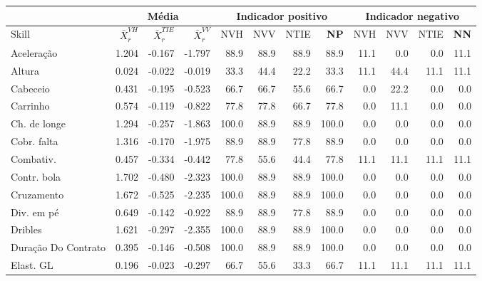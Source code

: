 \documentclass[review]{elsarticle}
\begin{document}
\begin{table}[!h]
\begin{scriptsize}
\begin{tabular}{l||rrr||rrr|r|||rrr||r}
  \hline
     \hline
\rowcolor{SeaGreen3!30!} & \multicolumn{3}{c||}{Média} &   \multicolumn{4}{c|||}{Indicador positivo} & \multicolumn{4}{c}{Indicador negativo} \\
\hline 
  \hline
\rowcolor{SeaGreen3!30!} Skill &  $\bar{X}_r^{VH}$ &  $\bar{X}_r^{TIE}$ &  $\bar{X}_r^{VV}$ & NVH & NVV & NTIE & \textbf{NP }& NVH & NVV & NTIE & \textbf{NN }\\ 
 \hline
\rowcolor{gray!30!} Aceleração & 1.204 & -0.167 & -1.797 & 88.9 & 88.9 & 88.9 & 88.9 & 11.1 & 0.0 & 0.0 & 11.1 \\ 
\rowcolor{gray!10!} Altura & 0.024 & -0.022 & -0.019 & 33.3 & 44.4 & 22.2 & 33.3 & 11.1 & 44.4 & 11.1 & 11.1 \\ 
\rowcolor{gray!30!} Cabeceio & 0.431 & -0.195 & -0.523 & 66.7 & 66.7 & 55.6 & 66.7 & 0.0 & 22.2 & 0.0 & 0.0 \\ 
\rowcolor{gray!10!} Carrinho & 0.574 & -0.119 & -0.822 & 77.8 & 77.8 & 66.7 & 77.8 & 0.0 & 11.1 & 0.0 & 0.0 \\ 
\rowcolor{gray!30!} Ch. de longe & 1.294 & -0.257 & -1.863 & 100.0 & 88.9 & 88.9 & 100.0 & 0.0 & 0.0 & 0.0 & 0.0 \\ 
\rowcolor{gray!10!} Cobr. falta & 1.316 & -0.170 & -1.975 & 88.9 & 88.9 & 77.8 & 88.9 & 0.0 & 0.0 & 0.0 & 0.0 \\ 
\rowcolor{gray!30!} Combativ. & 0.457 & -0.334 & -0.442 & 77.8 & 55.6 & 44.4 & 77.8 & 11.1 & 11.1 & 11.1 & 11.1 \\ 
\rowcolor{gray!10!} Contr. bola & 1.702 & -0.480 & -2.323 & 100.0 & 88.9 & 88.9 & 100.0 & 0.0 & 0.0 & 0.0 & 0.0 \\ 
\rowcolor{gray!30!} Cruzamento & 1.672 & -0.525 & -2.235 & 100.0 & 88.9 & 88.9 & 100.0 & 0.0 & 0.0 & 0.0 & 0.0 \\ 
\rowcolor{gray!10!} Div. em pé & 0.649 & -0.142 & -0.922 & 88.9 & 88.9 & 77.8 & 88.9 & 0.0 & 0.0 & 0.0 & 0.0 \\ 
\rowcolor{gray!30!} Dribles & 1.621 & -0.297 & -2.355 & 100.0 & 88.9 & 88.9 & 100.0 & 0.0 & 0.0 & 0.0 & 0.0 \\ 
\rowcolor{gray!10!} Duração Do Contrato & 0.395 & -0.146 & -0.508 & 100.0 & 88.9 & 88.9 & 100.0 & 0.0 & 0.0 & 0.0 & 0.0 \\ 
\rowcolor{gray!30!} Elast. GL & 0.196 & -0.023 & -0.297 & 66.7 & 55.6 & 33.3 & 66.7 & 11.1 & 11.1 & 11.1 & 11.1 \\ 

\end{tabular}
\end{scriptsize}
\end{table}
\end{document}
